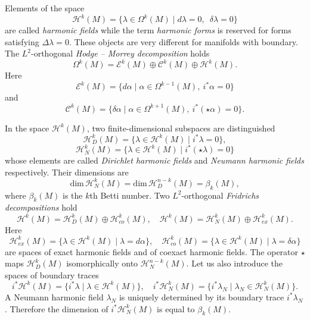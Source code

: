 \documentclass[12pt,reqno]{amsart}
\begin{document}
Elements of the space
$$
{\mathcal H}^k(M)=
\{\lambda\in\Omega^k(M)\mid d\lambda=0,\,\,\,\delta\lambda=0\}
$$
are called {\it harmonic fields} while the term {\it harmonic forms} is reserved for forms satisfying $\Delta\lambda=0$. These objects are very different for manifolds with boundary. The $ L^2 $-orthogonal {\it Hodge -- Morrey decomposition} holds
$$
\Omega^k(M)=
{\mathcal E}^k(M)\oplus{\mathcal C}^k(M)\oplus{\mathcal H}^k(M).
$$
Here
$$
{\mathcal E}^k(M)=
\{d\alpha\mid \alpha\in\Omega^{k-1}(M),\ i^*\alpha=0\}
$$
and
$$
{\mathcal C}^k(M)=
\{\delta\alpha\mid \alpha\in\Omega^{k+1}(M),\ i^*(\star\alpha)=0\}.
$$

In the space
$ {\mathcal H}^k(M) $,
two finite-dimensional subspaces are distinguished
$$
{\mathcal H}^k_D(M)=
\{\lambda\in{\mathcal H}^k(M)\mid i^*\lambda=0\},
$$
$$
{\mathcal H}^k_N(M)=
\{\lambda\in{\mathcal H}^k(M)\mid i^*(\star\lambda)=0\}
$$
whose elements are called {\it Dirichlet harmonic fields} and {\it Neumann harmonic fields} respectively. Their dimensions are
$$
\mbox{dim}\,{\mathcal H}^k_N(M)
=
\mbox{dim}\,{\mathcal H}^{n-k}_D(M)
=
\beta_k(M),
$$
where $ \beta_k(M) $ is the $ k $th Betti number.
Two $ L^2 $-orthogonal {\it Fridrichs decompositions} hold
\begin{equation}
{\mathcal H}^k(M)={\mathcal H}^k_D(M)
\oplus
{\mathcal H}^k_{{co}}(M),\quad
{\mathcal H}^k(M)={\mathcal H}^k_N(M)
\oplus
{\mathcal H}^k_{{ex}}(M).
                                \label{2.1}
\end{equation}
Here
$$
{\mathcal H}^k_{{ex}}(M)
=
\{\lambda\in{\mathcal H}^k(M)\mid \lambda=d\alpha\},
\quad
{\mathcal H}^k_{{co}}(M)
=
\{\lambda\in{\mathcal H}^k(M)\mid \lambda=\delta\alpha\}
$$
are spaces of exact harmonic fields and of coexact harmonic fields.
The operator $ \star $ maps
$ {\mathcal H}^k_D(M) $ isomorphically onto
$ {\mathcal H}^{n-k}_N(M) $.
Let us also introduce the spaces of boundary traces
$$
i^*{\mathcal H}^{k}(M)=
\{i^*\lambda\mid\lambda\in{\mathcal H}^{k}(M)\},
\quad
i^*{\mathcal H}^{k}_N(M)=
\{i^*\lambda_N\mid\lambda_N\in{\mathcal H}^{k}_N(M)\}.
$$
A Neumann harmonic field $ \lambda_N $ is uniquely determined by its boundary trace $ i^*\lambda_N $.
Therefore the dimension of $ i^*{\mathcal H}^{k}_N(M) $
is equal to
$ \beta_k(M) $.
\end{document}
